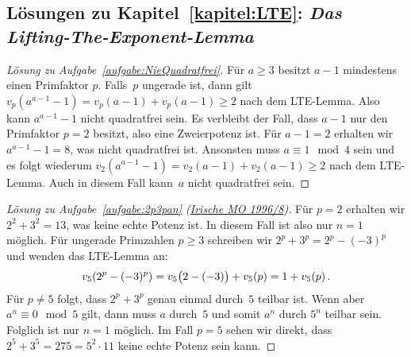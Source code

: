 \subsection*{Lösungen zu Kapitel~\ref{kapitel:LTE}: \emph{Das Lifting-The-Exponent-Lemma}}

\begin{proof}[Lösung zu Aufgabe~\ref{aufgabe:NieQuadratfrei}]
	Für $a\geqslant 3$ besitzt $a-1$ mindestens einen Primfaktor $p$. Falls~$p$ ungerade ist, dann gilt $v_p(a^{a-1}-1)=v_p(a-1)+v_p(a-1)\geqslant 2$ nach dem LTE-Lemma. Also kann $a^{a-1}-1$ nicht quadratfrei sein. Es verbleibt der Fall, dass $a-1$ nur den Primfaktor $p=2$ besitzt, also eine Zweierpotenz ist. Für $a-1=2$ erhalten wir $a^{a-1}-1=8$, was nicht quadratfrei ist. Ansonsten muss $a\equiv 1\mod 4$ sein und es folgt wiederum $v_2(a^{a-1}-1)=v_2(a-1)+v_2(a-1)\geqslant 2$ nach dem LTE-Lemma. Auch in diesem Fall kann~$a$ nicht quadratfrei sein.
\end{proof}

\begin{proof}[Lösung zu Aufgabe~\ref{aufgabe:2p3pan} \textmd{(\href{https://artofproblemsolving.com/community/c583198_1996_irish_math_olympiad}{Irische MO 1996/8})}]
	Für $p=2$ erhalten wir $2^2+3^2=13$, was keine echte Potenz ist. In diesem Fall ist also nur $n=1$ möglich. Für ungerade Primzahlen $p\geqslant 3$ schreiben wir $2^p+3^p=2^p-(-3)^p$ und wenden das LTE-Lemma an:
	\begin{equation*}
		v_5\parens*{2^p-(-3)^p}=v_5\parens[\big]{2-(-3)}+v_5(p)=1+v_5(p)\,.
	\end{equation*}
	Für $p\neq 5$ folgt, dass $2^p+3^p$ genau einmal durch~$5$ teilbar ist. Wenn aber $a^n\equiv 0\mod 5$ gilt, dann muss $a$ durch~$5$ und somit $a^n$ durch $5^n$ teilbar sein. Folglich ist nur $n=1$ möglich. Im Fall $p=5$ sehen wir direkt, dass $2^5+3^5=275=5^2\cdot 11$ keine echte Potenz sein kann.
\end{proof}


